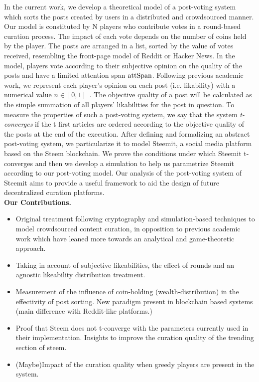  In the current work, we develop a theoretical model of a post-voting system which sorts the posts created by users in a distributed and crowdsourced manner.
  Our model is constituted by N players who contribute votes in a round-based curation process. The impact of each vote depends on the number of coins held by the player.
   The posts are arranged in a list, sorted by the value of votes received, resembling the front-page model of Reddit or Hacker News. In the model, players vote according to their subjective opinion on the quality of the posts and have a limited attention span $\mathrm{attSpan}$.
   Following previous academic work, we represent each player's opinion on each post (i.e. likability) with a numerical value $n \in [ 0,1 ]$~\cite{ghosh2011incentivizing,askalidis2013theoretical}.
   The objective quality of a post will be calculated as the simple summation of all players' likabilities for the post in question. To measure the properties of such a post-voting system, we say that the system \textit{t-converges} if the t first articles are ordered according to the objective quality of the posts at the end of the execution.
  After defining and formalizing an abstract post-voting system, we particularize it to model Steemit, a social media platform based on the Steem blockchain.
   We prove the conditions under which Steemit t-converges and then we develop a simulation to help us parametrize Steemit according to our post-voting model.
   Our analysis of the post-voting system of Steemit aims to provide a useful framework to aid the design of future decentralized curation platforms.\\

  \textbf{Our Contributions.}
  \begin{itemize}
  \item Original treatment following cryptography and simulation-based techniques to model crowdsourced content curation, in opposition to previous academic work which have leaned more towards an analytical and game-theoretic approach.

  \item Taking in account of subjective likeabilities, the effect of rounds and an agnostic likeability distribution treatment.

  \item Measurement of the influence of coin-holding (wealth-distribution) in the effectivity of post sorting. New paradigm present in blockchain based systems (main difference with Reddit-like platforms.)

  \item Proof that Steem does not t-converge with the parameters currently used in their implementation. Insights to improve the curation quality of the trending section of steem.

  \item (Maybe)Impact of the curation quality when greedy players are present in the system.
  \end{itemize}
